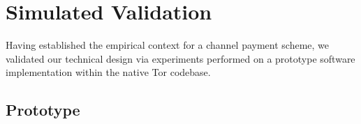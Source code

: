 
\section{Simulated Validation}
\label{sec:experimentations}

Having established the empirical context for a channel payment scheme, we
validated our technical design via experiments performed on a prototype
software implementation within the native Tor codebase.

\subsection{Prototype}

